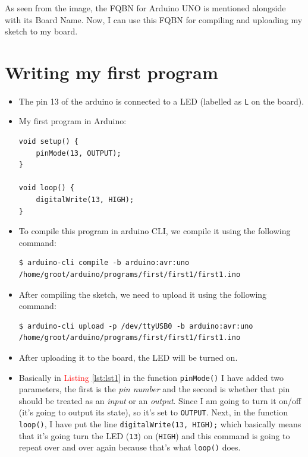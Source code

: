 \documentclass{article}
\begin{document}
\begin{itemize}
As seen from the image, the FQBN for Arduino UNO is mentioned alongside with its Board Name. Now, I can use this FQBN for compiling and uploading my sketch to my board.
\end{itemize}

\pagebreak

\section{Writing my first program}
\paragraph{}

\begin{itemize}
	\item The pin 13 of the arduino is connected to a LED (labelled as \lstinline|L| on the board).
	\item My first program in Arduino:
	
	\begin{lstlisting}[frame=TlbR, caption=First program, label=lst:lst1]
void setup() {
	pinMode(13, OUTPUT);
}

void loop() {
	digitalWrite(13, HIGH);
}

	\end{lstlisting}

	\item To compile this program in arduino CLI, we compile it using the following command:
	
	\begin{lstlisting}[frame=tLBr, caption=Compiling an arduino program]
$ arduino-cli compile -b arduino:avr:uno /home/groot/arduino/programs/first/first1/first1.ino
	\end{lstlisting}

	\item After compiling the sketch, we need to upload it using the following command:
	
	\begin{lstlisting}[frame=tLBr, caption=Uploading the sketch]
$ arduino-cli upload -p /dev/ttyUSB0 -b arduino:avr:uno /home/groot/arduino/programs/first/first1/first1.ino
	\end{lstlisting}

	\item After uploading it to the board, the LED will be turned on.
	
	\item Basically in \textcolor{Red}{Listing \ref{lst:lst1}} in the function \lstinline|pinMode()| I have added two parameters, the first is the \emph{pin number} and the second is whether that pin should be treated as an \emph{input} or an \emph{output}. Since I am going to turn it on/off (it's going to output its state), so it's set to \lstinline|OUTPUT|. Next, in the function \lstinline|loop()|, I have put the line \lstinline|digitalWrite(13, HIGH);| which basically means that it's going turn the LED (\lstinline|13|) on (\lstinline|HIGH|) and this command is going to repeat over and over again because that's what \lstinline|loop()| does.
	

\end{itemize}
\end{document}
